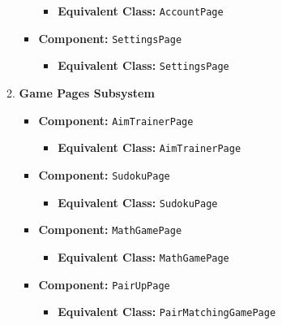 \documentclass[11pt,a4paper]{article}
\begin{document}
\begin{enumerate}[label=\textbf{\arabic*.}, ref=\arabic*]
\begin{enumerate}[label=\textbf{\alph*.}, ref=\theenumi.\alph*]
\begin{itemize}
\begin{itemize}
                            \item \textbf{Equivalent Class:} \texttt{AccountPage}
                        \end{itemize}
                    \item \textbf{Component:} \texttt{SettingsPage}
                        \begin{itemize}
                            \item \textbf{Equivalent Class:} \texttt{SettingsPage}
                        \end{itemize}
                \end{itemize}
            \item \textbf{Game Pages Subsystem}
                \begin{itemize}
                    \item \textbf{Component:} \texttt{AimTrainerPage}
                        \begin{itemize}
                            \item \textbf{Equivalent Class:} \texttt{AimTrainerPage}
                        \end{itemize}
                    \item \textbf{Component:} \texttt{SudokuPage}
                        \begin{itemize}
                            \item \textbf{Equivalent Class:} \texttt{SudokuPage}
                        \end{itemize}
                    \item \textbf{Component:} \texttt{MathGamePage}
                        \begin{itemize}
                            \item \textbf{Equivalent Class:} \texttt{MathGamePage}
                        \end{itemize}
                    \item \textbf{Component:} \texttt{PairUpPage}
                        \begin{itemize}
                            \item \textbf{Equivalent Class:} \texttt{PairMatchingGamePage}
                        \end{itemize}
                \end{itemize}
        \end{enumerate}
\end{enumerate}
\end{document}
